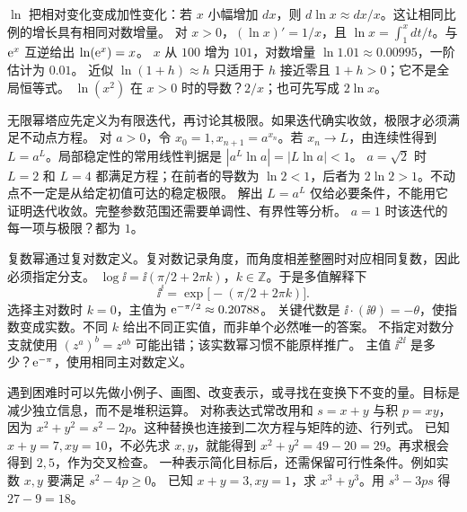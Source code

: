 \idea $\ln$ 把相对变化变成加性变化：若 $x$ 小幅增加 $dx$，则 $d\ln x\approx dx/x$。这让相同比例的增长具有相同对数增量。
\mathpart 对 $x>0$，$(\ln x)'=1/x$，且 $\ln x=\int_1^x dt/t$。与 $\mathrm e^x$ 互逆给出 $\ln(\mathrm e^x)=x$。
\examplepart $x$ 从 $100$ 增为 $101$，对数增量 $\ln1.01\approx0.00995$，一阶估计为 $0.01$。
\pitfall 近似 $\ln(1+h)\approx h$ 只适用于 $h$ 接近零且 $1+h>0$；它不是全局恒等式。
\exercise $\ln(x^2)$ 在 $x>0$ 时的导数？$2/x$；也可先写成 $2\ln x$。
\nextlesson

\idea 无限幂塔应先定义为有限迭代，再讨论其极限。如果迭代确实收敛，极限才必须满足不动点方程。
\mathpart 对 $a>0$，令 $x_0=1,x_{n+1}=a^{x_n}$。若 $x_n\to L$，由连续性得到 $L=a^L$。局部稳定性的常用线性判据是 $|a^L\ln a|=|L\ln a|<1$。
\examplepart $a=\sqrt2$ 时 $L=2$ 和 $L=4$ 都满足方程；在前者的导数为 $\ln2<1$，后者为 $2\ln2>1$。不动点不一定是从给定初值可达的稳定极限。
\pitfall 解出 $L=a^L$ 仅给必要条件，不能用它证明迭代收敛。完整参数范围还需要单调性、有界性等分析。
\exercise $a=1$ 时该迭代的每一项与极限？都为 $1$。
\nextlesson

\idea 复数幂通过复对数定义。复对数记录角度，而角度相差整圈时对应相同复数，因此必须指定分支。
\mathpart $\log\ii=\ii(\pi/2+2\pi k)$，$k\in\mathbb Z$。于是多值解释下
\[\ii^{\ii}=\exp\bigl[-(\pi/2+2\pi k)\bigr].\]
选择主对数时 $k=0$，主值为 $\mathrm e^{-\pi/2}\approx0.20788$。
\examplepart 关键代数是 $\ii\cdot(\ii\theta)=-\theta$，使指数变成实数。不同 $k$ 给出不同正实值，而非单个必然唯一的答案。
\pitfall 不指定对数分支就使用 $(z^a)^b=z^{ab}$ 可能出错；该实数幂习惯不能原样推广。
\exercise 主值 $\ii^{2\ii}$ 是多少？$\mathrm e^{-\pi}$，使用相同主对数定义。
\nextlesson

\idea 遇到困难时可以先做小例子、画图、改变表示，或寻找在变换下不变的量。目标是减少独立信息，而不是堆积运算。
\mathpart 对称表达式常改用和 $s=x+y$ 与积 $p=xy$，因为 $x^2+y^2=s^2-2p$。这种替换也连接到二次方程与矩阵的迹、行列式。
\examplepart 已知 $x+y=7,xy=10$，不必先求 $x,y$，就能得到 $x^2+y^2=49-20=29$。再求根会得到 $2,5$，作为交叉检查。
\pitfall 一种表示简化目标后，还需保留可行性条件。例如实数 $x,y$ 要满足 $s^2-4p\ge0$。
\exercise 已知 $x+y=3,xy=1$，求 $x^3+y^3$。用 $s^3-3ps$ 得 $27-9=18$。
